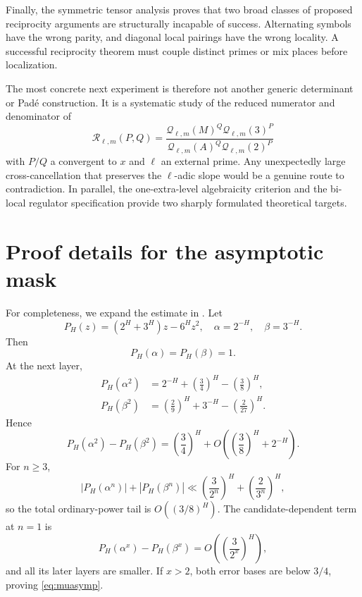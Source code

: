 \documentclass[11pt]{article}
\numberwithin{equation}{section}
\theoremstyle{definition}
\theoremstyle{remark}
\begin{document}
Finally, the symmetric tensor analysis proves that two broad classes of proposed reciprocity arguments are structurally incapable of success.  Alternating symbols have the wrong parity, and diagonal local pairings have the wrong locality.  A successful reciprocity theorem must couple distinct primes or mix places before localization.

The most concrete next experiment is therefore not another generic determinant or Pad\'e construction.  It is a systematic study of the reduced numerator and denominator of
\[
  \mathscr R_{\ell,m}(P,Q)=
  \frac{\mathcal Q_{\ell,m}(M)^Q\mathcal Q_{\ell,m}(3)^P}
       {\mathcal Q_{\ell,m}(A)^Q\mathcal Q_{\ell,m}(2)^P}
\]
with $P/Q$ a convergent to $x$ and $\ell$ an external prime.  Any unexpectedly large cross-cancellation that preserves the $\ell$-adic slope would be a genuine route to contradiction.  In parallel, the one-extra-level algebraicity criterion and the bi-local regulator specification provide two sharply formulated theoretical targets.

\appendix

\section{Proof details for the asymptotic mask}

For completeness, we expand the estimate in .  Let
\[
  P_H(z)=(2^H+3^H)z-6^Hz^2,
  \quad \alpha=2^{-H},\quad\beta=3^{-H}.
\]
Then
\[
  P_H(\alpha)=P_H(\beta)=1.
\]
At the next layer,
\begin{align}
  P_H(\alpha^2)
  &=2^{-H}+\left(\frac34\right)^H-
    \left(\frac38\right)^H,\label{eq:Palpha2}\\
  P_H(\beta^2)
  &=\left(\frac29\right)^H+3^{-H}-
    \left(\frac{2}{27}\right)^H.\label{eq:Pbeta2}
\end{align}
Hence
\begin{equation}\label{eq:Pdiff2}
  P_H(\alpha^2)-P_H(\beta^2)
  =\left(\frac34\right)^H
   +O\!\left(\left(\frac38\right)^H+2^{-H}\right).
\end{equation}
For $n\ge3$,
\[
  |P_H(\alpha^n)|+|P_H(\beta^n)|
  \ll \left(\frac{3}{2^n}\right)^H+
       \left(\frac{2}{3^n}\right)^H,
\]
so the total ordinary-power tail is $O((3/8)^H)$.  The candidate-dependent term at $n=1$ is
\[
  P_H(\alpha^x)-P_H(\beta^x)
  =O\!\left(\left(\frac3{2^x}\right)^H\right),
\]
and all its later layers are smaller.  If $x>2$, both error bases are below $3/4$, proving \eqref{eq:muasymp}.
\end{document}
